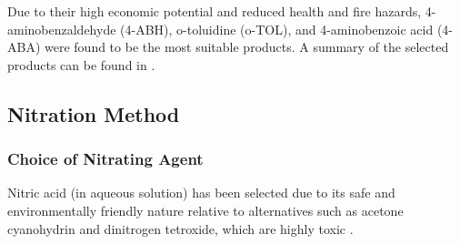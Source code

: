 Due to their high economic potential and reduced health and fire hazards, 4-aminobenzaldehyde (4-ABH), o-toluidine (o-TOL), and 4-aminobenzoic acid (4-ABA) were found to be the most suitable products. A  summary of the selected products can be found in .


\subsection{Nitration Method}
\subsubsection{Choice of Nitrating Agent}
Nitric acid (in aqueous solution) has been selected due to its safe and environmentally friendly nature relative to alternatives such as acetone cyanohydrin and dinitrogen tetroxide, which are highly toxic \cite{miller_kinetics_1964,dagade_nitration_2002, sreedhar_scientific_2013}. 

\begin{comment}
Nitric acid has been selected as the source of nitrogen for the nitration of toluene for its safe and environmentally friendly nature relative to other possible nitrating agents, high availability, and its various favourable properties \cite{miller_kinetics_1964, sreedhar_scientific_2013}. Although nitric acid is a highly acidic and volatile compound, compared to alternatives such as acetone cyanohydrin and dinitrogen tetroxide which are highly toxic, nitric acid is more appropriate for industrial-scale nitration of toluene \cite{dagade_nitration_2002, sreedhar_scientific_2013}. Nitric acid, introduced as an aqueous solution, is the most commonly used and well-studied nitrating agent for this process in industry. \cite{bowers_toluidines_2000} A big advantage of aqueous nitric acid is that it can act as a self-catalyst by self-donating protons. \cite{miller_kinetics_1964} A common alternative to nitric acid is acetyl nitrate which is formed by the reaction of nitric acid with acetic anhydride. \cite{vassena_selective_1999} This reaction yields formic acid as by-product, resulting in a lower atom economy; it also causes unnecessary difficulties in separations downstream by introducing three extra components: acetyl nitrate, acetic anhydride, and formic acid. The same argument can be employed for other alkyl nitrates such as butyl nitrate. To this end, nitric acid is deemed as the most suitable choice among all candidates.
\end{comment}

